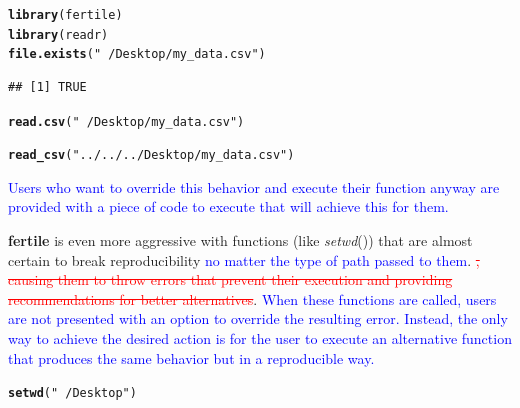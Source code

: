 \documentclass[APA,LATO1COL]{WileyNJD-v2}\usepackage[]{graphicx}\usepackage[]{color}
\makeatletter
\newcommand{\hlstr}[1]{\textcolor[rgb]{0.192,0.494,0.8}{#1}}%
\newcommand{\hlstd}[1]{\textcolor[rgb]{0.345,0.345,0.345}{#1}}%
\newcommand{\hlkwd}[1]{\textcolor[rgb]{0.737,0.353,0.396}{\textbf{#1}}}%
\newenvironment{kframe}{%
 \def\at@end@of@kframe{}%
 \ifinner\ifhmode%
  \def\at@end@of@kframe{\end{minipage}}%
  \begin{minipage}{\columnwidth}%
 \fi\fi%
 \def\FrameCommand##1{\hskip\@totalleftmargin \hskip-\fboxsep
 \colorbox{shadecolor}{##1}\hskip-\fboxsep
     \hskip-\linewidth \hskip-\@totalleftmargin \hskip\columnwidth}%
 \MakeFramed {\advance\hsize-\width
   \@totalleftmargin\z@ \linewidth\hsize
   \@setminipage}}%
 {\par\unskip\endMakeFramed%
 \at@end@of@kframe}
\newenvironment{knitrout}{}{} %
\newcommand{\pkg}[1]{\textbf{#1}}
\newcommand{\func}[1]{\textit{#1}()}
\makeatother
\begin{document}
\begin{knitrout}
\color{fgcolor}\begin{kframe}
\begin{alltt}
\hlkwd{library}\hlstd{(fertile)}
\hlkwd{library}\hlstd{(readr)}
\hlkwd{file.exists}\hlstd{(}\hlstr{"~/Desktop/my_data.csv"}\hlstd{)}
\end{alltt}
\begin{verbatim}
## [1] TRUE
\end{verbatim}
\begin{alltt}
\hlkwd{read.csv}\hlstd{(}\hlstr{"~/Desktop/my_data.csv"}\hlstd{)}
\end{alltt}


{\ttfamily\noindent\bfseries{}}\begin{alltt}
\hlkwd{read_csv}\hlstd{(}\hlstr{"../../../Desktop/my_data.csv"}\hlstd{)}
\end{alltt}


{\ttfamily\noindent\bfseries\color{errorcolor}{\#\# Error: Detected paths that lead outside the project directory. Such paths are not reproducible and will likely only work on your computer. If you would like to continue anyway, please execute the following command: readr::read\_csv('../../../Desktop/my\_data.csv')}}\end{kframe}
\end{knitrout}

\textcolor{blue}{Users who want to override this behavior and execute their function anyway are provided with a piece of code to execute that will achieve this for them.}

\pkg{fertile} is even more aggressive with functions (like \func{setwd}) that are almost certain to break reproducibility \textcolor{blue}{no matter the type of path passed to them}. \textcolor{red}{\st{, causing them to throw errors that prevent their execution and providing recommendations for better alternatives}}. \textcolor{blue}{When these functions are called, users are not presented with an option to override the resulting error. Instead, the only way to achieve the desired action is for the user to execute an alternative function that produces the same behavior but in a reproducible way.}

\begin{knitrout}
\color{fgcolor}\begin{kframe}
\begin{alltt}
\hlkwd{setwd}\hlstd{(}\hlstr{"~/Desktop"}\hlstd{)}
\end{alltt}


{\ttfamily\noindent\bfseries\color{errorcolor}{\#\# Error: setwd() is likely to break reproducibility. Use here::here() instead.}}\end{kframe}
\end{knitrout}
\end{document}
